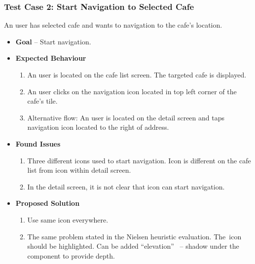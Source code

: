 \subsubsection{Test Case 2: Start Navigation to Selected Cafe}
An user has selected cafe and wants to navigation to the cafe's location.
\begin{itemize}
    \item \textbf{Goal} -- Start navigation.
    \item \textbf{Expected Behaviour}
    \begin{enumerate}
        \item An user is located on the cafe list screen. The targeted cafe is displayed.
        \item An user clicks on the navigation icon located in top left corner of the cafe's tile. 
        \item Alternative flow: An user is located on the detail screen and taps navigation icon located to the right of address.
    \end{enumerate}
    \item \textbf{Found Issues}
    \begin{enumerate}
        \item Three different icons used to start navigation. Icon is different on the cafe list from icon within detail screen.
        \item In the detail screen, it is not clear that icon can start navigation.
    \end{enumerate}
    \item \textbf{Proposed Solution}
    \begin{enumerate}
        \item Use same icon everywhere.
        \item The same problem stated in the Nielsen heuristic evaluation. The~icon should be highlighted. Can be added ``elevation''~\cite{material-design-elevation} -- shadow under the component to provide depth. 
    \end{enumerate}
\end{itemize}
